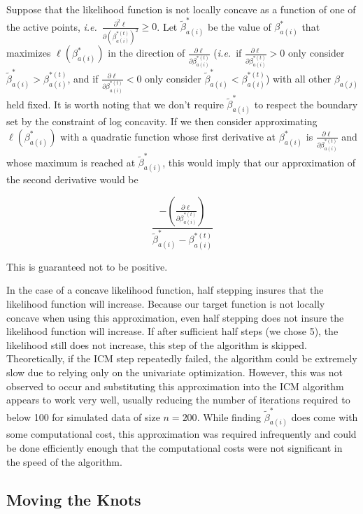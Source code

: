 \documentclass[10pt]{article}
\begin{document}
	Suppose that the likelihood function is not locally concave as a function of one of the active points, \emph{i.e.}\ $ \frac{\partial^2 \ell} { \partial {(\beta^{*(t)}_{a(i)})}^2} \geq 0$. Let $\tilde \beta^*_{a(i)}$ be the value of $\beta^*_{a(i)}$ that maximizes $\ell(\beta^*_{a(i)})$ in the direction of $ \frac{\partial \ell} {\partial \beta^{*(t)}_{a(i)}} $ (\emph{i.e.}\ if $  \frac{\partial \ell} {\partial \beta^{*(t)}_{a(i)}} > 0$ only consider  $\tilde \beta^*_{a(i)} > \beta^{*(t)}_{a(i)}$, and if $  \frac{\partial \ell} {\partial \beta^{*(t)}_{a(i)}}< 0 $ only consider $\tilde \beta^*_{a(i)} < \beta^{*(t)}_{a(i)}$)  with all other $\beta_{a(j)}$ held fixed. It is worth noting that we don't require $\tilde \beta^*_{a(i)}$ to respect the boundary set by the constraint of log concavity. If we then consider approximating $\ell(\beta^*_{a(i)})$ with a quadratic function whose first derivative at $\beta^*_{a(i)}$ is $  \frac{\partial \ell} {\partial \beta^{*(t)}_{a(i)}} $ and whose maximum is reached at $\tilde \beta^*_{a(i)}$, this would imply that our approximation of the second derivative would be
	
	 \[\frac{- \left( \frac{\partial \ell} {\partial \beta^{*(t)}_{a(i)} }  \right) } {\tilde \beta^*_{a(i)} -\beta^{*(t)}_{a(i)}}
	 \]
	 
	 This is guaranteed not to be positive.
	
	In the case of a concave likelihood function, half stepping insures that the likelihood function will increase. Because our target function is not locally concave when using this approximation, even half stepping does not insure the likelihood function will increase. If after sufficient half steps (we chose 5), the likelihood still does not increase, this step of the algorithm is skipped. Theoretically, if the ICM step repeatedly failed, the algorithm could be extremely slow due to relying only on the univariate optimization. However, this was not observed to occur and substituting this approximation into the ICM algorithm appears to work very well, usually reducing the number of iterations required to below 100 for simulated data of size $n = 200$. While finding  $\tilde \beta^*_{a(i)}$ does come with some computational cost, this approximation was required infrequently and could be done efficiently enough that the computational costs were not significant in the speed of the algorithm. 
	
		{\subsection{Moving the Knots} } 
	
\end{document}
